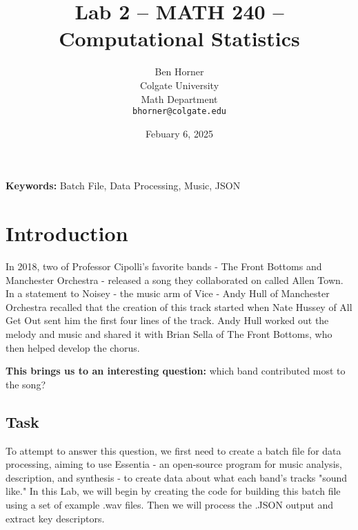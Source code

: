 \documentclass{article}\usepackage[]{graphicx}\usepackage[]{xcolor}
\begin{document}
\vspace{-1in}
\title{Lab 2 -- MATH 240 -- Computational Statistics}

\author{
  Ben Horner \\
  Colgate University  \\
  Math Department  \\
  {\tt bhorner@colgate.edu}
}

\date{Febuary 6, 2025}

\maketitle

\begin{multicols}{2}
\begin{abstract}

\end{abstract}

\noindent \textbf{Keywords:} Batch File, Data Processing, Music, JSON

\section{Introduction}
In 2018, two of Professor Cipolli's favorite bands - The Front Bottoms and Manchester Orchestra - released a song they collaborated on called Allen Town. In a statement to Noisey -  the music arm of Vice - Andy Hull of Manchester Orchestra recalled that the creation of this track started when Nate Hussey of All Get Out sent him the first four lines of the track. Andy Hull worked out the melody and music and shared it with Brian Sella of The Front Bottoms, who then helped develop the chorus.

\textbf{This brings us to an interesting question:} which band contributed most to the song?
 
 
\subsection{Task}
  To attempt to answer this question, we first need to create a batch file for data processing, aiming to use Essentia - an open-source program for music analysis, description, and synthesis - to create data about what each band's tracks "sound like." In this Lab, we will begin by creating the code for building this batch file using a set of example .wav files. Then we will process the .JSON output and extract key descriptors.




\end{multicols}
\end{document}
